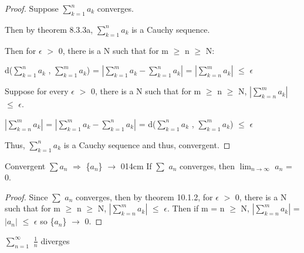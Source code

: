     \begin{proof}
        Suppose $\sum_{k=1}^n a_k$ converges.

        Then by {\color{red} theorem 8.3.3a}, $\sum_{k=1}^n a_k$ is 
        a Cauchy sequence.

        Then for $\epsilon$ $>$ 0, there is a N such that for
        m $\geq$ n $\geq$ N:

        \hspace{1cm}
        d($\sum_{k=1}^n a_k$ , $\sum_{k=1}^m a_k$)
        = $| \sum_{k=1}^m a_k - \sum_{k=1}^n a_k |$
        = $| \sum_{k=n}^m a_k |$ $\leq$ $\epsilon$

        \vspace{0.2cm}

        Suppose for every $\epsilon$ $>$ 0, there is a N
        such that for m $\geq$ n $\geq$ N,
        $| \sum_{k=n}^m a_k |$ $\leq$ $\epsilon$.

        \hspace{1cm}
        $| \sum_{k=n}^m a_k |$
        = $| \sum_{k=1}^m a_k - \sum_{k=1}^n a_k |$
        = d($\sum_{k=1}^n a_k$ , $\sum_{k=1}^m a_k$) $\leq$ $\epsilon$

        Thus, $\sum_{k=1}^n a_k$ is a Cauchy sequence
        and thus, convergent.
    \end{proof}

    \vspace{0.5cm}



    \begin{wtheorem}{Convergent $\sum a_n$
    $\Rightarrow$ \{$a_n$\} $\rightarrow$ 0}{14cm}
        If $\sum$ $a_n$ converges, then
        $\lim_{n \rightarrow \infty}$ $a_n$ = 0.
    \end{wtheorem}
    
    \begin{proof}
        Since $\sum$ $a_n$ converges, then by {\color{red} theorem 10.1.2},
        for $\epsilon$ $>$ 0, there is a N such that for m $\geq$ n $\geq$ N,
        $| \sum_{k=n}^m a_k |$ $\leq$ $\epsilon$.
        Then if m = n $\geq$ N, $| \sum_{k=n}^m a_k |$ = $| a_n |$
        $\leq$ $\epsilon$ so \{$a_n$\} $\rightarrow$ 0.
    \end{proof}

    \vspace{0.5cm}



    \begin{example}
        $\sum_{n=1}^{\infty}$ $\frac{1}{n}$ diverges
    \end{example}
    
